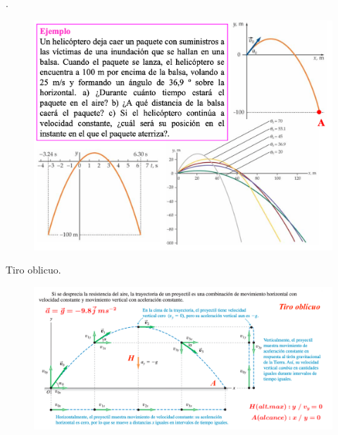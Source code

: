 \begin{prob}.
	\begin{figure}[H]
		\centering
		\includegraphics[width=.85\textwidth]{imagenes/imagenes02/T02IM27.png}
		\end{figure}
\end{prob}



\begin{prob} Tiro oblicuo.
\end{prob}	

\vspace{-5mm} \begin{figure}[H]
		\centering
		\includegraphics[width=1.1\textwidth]{imagenes/imagenes02/T02IM20.png}
		\end{figure}
		
